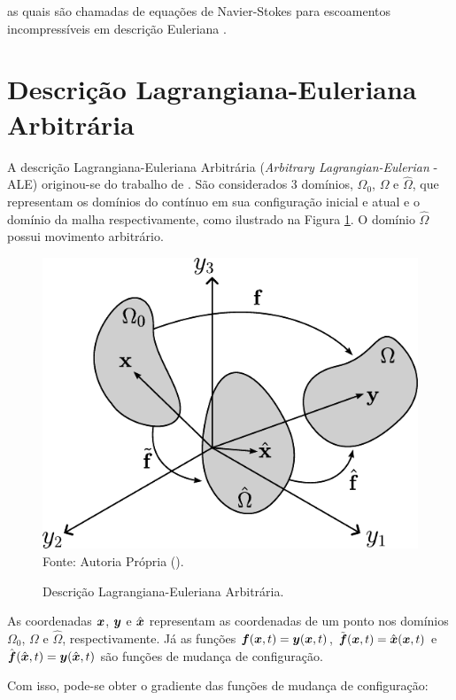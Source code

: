\noindent as quais são chamadas de equações de Navier-Stokes para escoamentos incompressíveis em descrição Euleriana \cite{bazilevs2013computational,bazilevs2010large,bazilevs2007variational,hughes2002variational,hughes2000large}.

\section{Descrição Lagrangiana-Euleriana Arbitrária} \label{CFD-ALE}

A descrição Lagrangiana-Euleriana Arbitrária (\textit{Arbitrary Lagrangian-Eulerian} - ALE) originou-se do trabalho de . São considerados 3 domínios, $\Omega_0$, $\Omega$ e $\hat{\Omega}$, que representam os domínios do contínuo em sua configuração inicial e atual e o domínio da malha respectivamente, como ilustrado na Figura \ref{Fig:ALE}. O domínio $\hat{\Omega}$ possui movimento arbitrário.

\begin{figure}[h!]
    \centering
    \caption{Descrição Lagrangiana-Euleriana Arbitrária.}
    \includegraphics[width=.45\linewidth]{Figuras/ALE.pdf}
    \label{Fig:ALE}
    \\Fonte: Autoria Própria (\the\year).
\end{figure}


As coordenadas $\boldsymbol{x}$, $\boldsymbol{y}$ e $\hat{\boldsymbol{x}}$ representam as coordenadas de um ponto nos domínios $\Omega_0$, $\Omega$ e $\hat{\Omega}$, respectivamente. Já as funções $\boldsymbol{f}(\boldsymbol{x},t)=\boldsymbol{y}(\boldsymbol{x},t)$, $\tilde{\boldsymbol{f}}(\boldsymbol{x},t)=\hat{\boldsymbol{x}}(\boldsymbol{x},t)$ e $\hat{\boldsymbol{f}}(\hat{\boldsymbol{x}},t)=\boldsymbol{y}(\hat{\boldsymbol{x}},t)$ são funções de mudança de configuração.

Com isso, pode-se obter o gradiente das funções de mudança de configuração:

